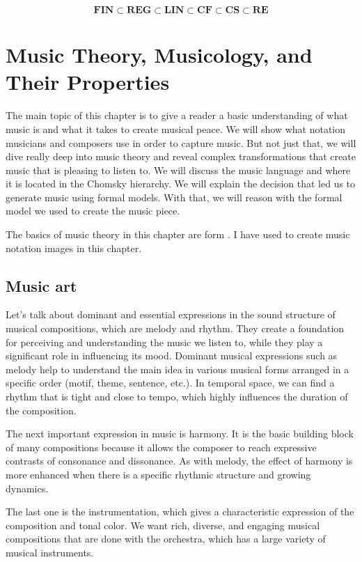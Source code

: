 \begin{theorem}
\label{teo1}
$$ \mathbf{FIN} \subset \mathbf{REG} \subset \mathbf{LIN} \subset \mathbf{CF} \subset \mathbf{CS} \subset \mathbf{RE}$$
\end{theorem}

\chapter{Music Theory, Musicology, and Their Properties}
\label{chap2}
The main topic of this chapter is to give a reader a basic understanding of what music is and what it takes to create musical peace. We will show what notation musicians and composers use in order to capture music. But not just that, we will dive really deep into music theory and reveal complex transformations that create music that is pleasing to listen to. We will discuss the music language and where it is located in the Chomsky hierarchy. We will explain the decision that led us to generate music using formal models. With that, we will reason with the formal model we used to create the music piece.

The basics of music theory in this chapter are form \cite{droppova1998}. I have used \cite{noteflight} to create music notation images in this chapter.

\section{Music art}
Let's talk about dominant and essential expressions in the sound structure of musical compositions, which are melody and rhythm. They create a foundation for perceiving and understanding the music we listen to, while they play a significant role in influencing its mood. Dominant musical expressions such as melody help to understand the main idea in various musical forms arranged in a specific order (motif, theme, sentence, etc.). In temporal space, we can find a rhythm that is tight and close to tempo, which highly influences the duration of the composition.

The next important expression in music is harmony. It is the basic building block of many compositions because it allows the composer to reach expressive contrasts of consonance and dissonance. As with melody, the effect of harmony is more enhanced when there is a specific rhythmic structure and growing dynamics.

The last one is the instrumentation, which gives a characteristic expression of the composition and tonal color. We want rich, diverse, and engaging musical compositions that are done with the orchestra, which has a large variety of musical instruments.

